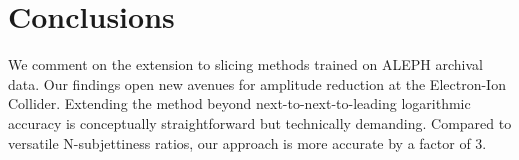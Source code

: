 \section{Conclusions}\label{sec:conclusions}

We comment on the extension to slicing methods trained on ALEPH archival
data. Our findings open new avenues for amplitude reduction at the
Electron-Ion Collider. Extending the method beyond
next-to-next-to-leading logarithmic accuracy is conceptually
straightforward but technically demanding. Compared to versatile
N-subjettiness ratios, our approach is more accurate by a factor of 3.

